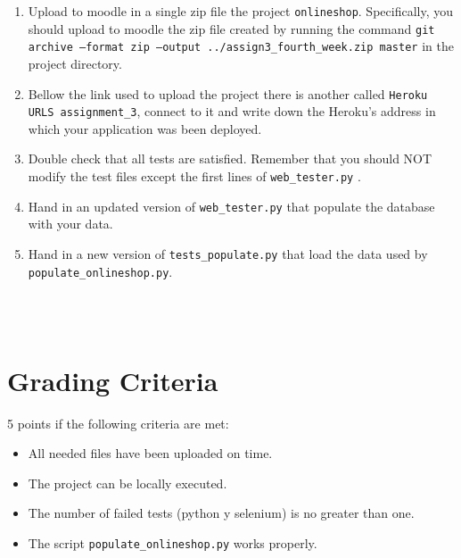 \documentclass[12pt]{article} %
\newcommand{\ttt}[1]{\texttt{#1}}%
\begin{document}
\begin{minipage}{\linewidth}
\begin{framed}
\begin{enumerate}

\item Upload to moodle in a single zip file the project \texttt{onlineshop}.
Specifically, you should upload to moodle the  zip file created by running the command \texttt{git archive --format zip --output ../assign3\_fourth\_week.zip  master}
in the project directory.

\item Bellow the link used to upload the project there is another called \texttt{Heroku URLS assignment\_3}, connect to it and write down the Heroku's address in which your application was been deployed.

\item Double check that all tests are satisfied. Remember that you should NOT modify the test files except the first lines of \ttt{web\_tester.py} .

\item Hand in an updated version of \ttt{web\_tester.py} that populate the database with your data.

\item Hand in a new version of  \texttt{tests\_populate.py} that load the data used by  \texttt{populate\_onlineshop.py}. 

\end{enumerate}
\end{framed}
\end{minipage}\\\\

\section{Grading Criteria}

5 points if the following criteria are met:
\begin{itemize}
 \item All needed files have been uploaded on time.
 \item The project can be locally executed.
 \item The number of failed tests (python y selenium)  is no greater than one.
 \item The script \texttt{populate\_onlineshop.py} works properly.

 \end{itemize}
 
\end{document}
